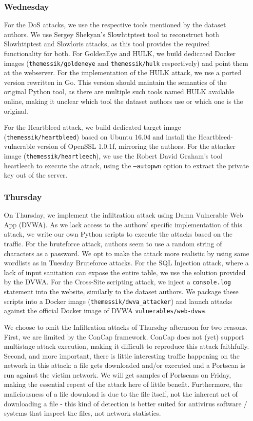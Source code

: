 \subsubsection{Wednesday}
For the DoS attacks, we use the respective tools mentioned by the dataset authors. We use Sergey Shekyan's Slowhttptest \cite{slowhttptest} tool to reconstruct both Slowhttptest and Slowloris attacks, as this tool provides the required functionality for both. For GoldenEye and HULK, we build dedicated Docker images (\texttt{themessik/goldeneye} and \texttt{themessik/hulk} respectively) and point them at the webserver. For the implementation of the HULK attack, we use a ported version rewritten in Go. This version should maintain the semantics of the original Python tool, as there are multiple such tools named HULK available online, making it unclear which tool the dataset authors use or which one is the original.

For the Heartbleed attack, we build dedicated target image (\texttt{themessik/heartbleed}) based on Ubuntu 16.04 and install the Heartbleed-vulnerable version of OpenSSL 1.0.1f, mirroring the authors. For the attacker image (\texttt{themessik/heartleech}), we use the Robert David Graham's tool heartleech \cite{heartleech} to execute the attack, using the \texttt{--autopwn} option to extract the private key out of the server. 

\subsubsection{Thursday}
On Thursday, we implement the infiltration attack using Damn Vulnerable Web App (DVWA). As we lack access to the authors' specific implementation of this attack, we write our own Python scripts to execute the attacks based on the traffic. For the bruteforce attack, authors seem to use a random string of characters as a password. We opt to make the attack more realistic by using same wordlists as in Tuesday Bruteforce attacks. For the SQL Injection attack, where a lack of input sanitation can expose the entire table, we use the solution provided by the DVWA. For the Cross-Site scripting attack, we inject a \texttt{console.log} statement into the website, similarly to the dataset authors. We package these scripts into a Docker image (\texttt{themessik/dwva\_attacker}) and launch attacks against the official Docker image of DVWA \texttt{vulnerables/web-dvwa}.
	
We choose to omit the Infiltration attacks of Thursday afternoon for two reasons. 
First, we are limited by the ConCap framework. ConCap does not (yet) support multistage attack execution, making it difficult to reproduce this attack faithfully.
Second, and more important, there is little interesting traffic happening on the network in this attack: a file gets downloaded and/or executed and a Portscan is run against the victim network. We will get samples of Portscans on Friday, making the essential repeat of the attack here of little benefit. Furthermore, the maliciousness of a file download is due to the file itself, not the inherent act of downloading a file - this kind of detection is better suited for antivirus software / systems that inspect the files, not network statistics.

